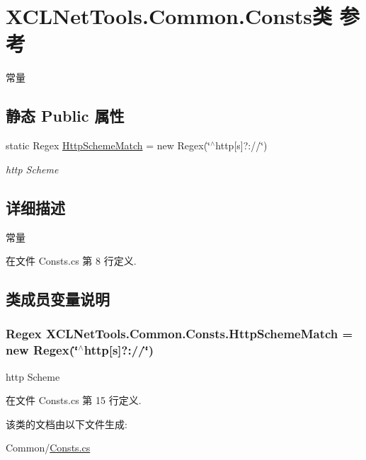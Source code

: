 \hypertarget{class_x_c_l_net_tools_1_1_common_1_1_consts}{\section{X\-C\-L\-Net\-Tools.\-Common.\-Consts类 参考}
\label{class_x_c_l_net_tools_1_1_common_1_1_consts}
}


常量  


\subsection*{静态 Public 属性}
\begin{DoxyCompactItemize}
\item 
static Regex \hyperlink{class_x_c_l_net_tools_1_1_common_1_1_consts_ab0d0e324cefcf408cb91eb4970cab692}{Http\-Scheme\-Match} = new Regex(\char`\"{}$^\wedge$http\mbox{[}s\mbox{]}?\-://\char`\"{})
\begin{DoxyCompactList}\small\item\em http Scheme \end{DoxyCompactList}\end{DoxyCompactItemize}


\subsection{详细描述}
常量 



在文件 Consts.\-cs 第 8 行定义.



\subsection{类成员变量说明}
\hypertarget{class_x_c_l_net_tools_1_1_common_1_1_consts_ab0d0e324cefcf408cb91eb4970cab692}{
\subsubsection[{Http\-Scheme\-Match}]{\setlength{\rightskip}{0pt plus 5cm}Regex X\-C\-L\-Net\-Tools.\-Common.\-Consts.\-Http\-Scheme\-Match = new Regex(\char`\"{}$^\wedge$http\mbox{[}s\mbox{]}?\-://\char`\"{})\hspace{0.3cm}{\ttfamily [static]}}}\label{class_x_c_l_net_tools_1_1_common_1_1_consts_ab0d0e324cefcf408cb91eb4970cab692}


http Scheme 



在文件 Consts.\-cs 第 15 行定义.



该类的文档由以下文件生成\-:\begin{DoxyCompactItemize}
\item 
Common/\hyperlink{_consts_8cs}{Consts.\-cs}\end{DoxyCompactItemize}
